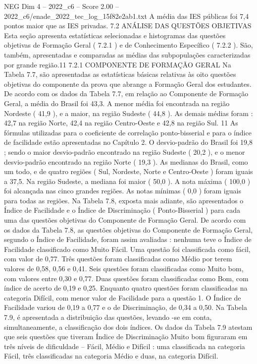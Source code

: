\begin{textsample}{NEG Dim 4 – 2022\_c6 – Score 2.00 – 2022\_c6/enade\_2022\_tec\_log\_15f82e2ab1.txt}
A média das IES públicas foi 7,4 pontos maior que as IES privadas. 7.2 ANÁLISE DAS QUESTÕES OBJETIVAS Esta seção apresenta estatísticas selecionadas e histogramas das questões objetivas de Formação Geral ( 7.2.1 ) e de Conhecimento Específico ( 7.2.2 ).
São, também, apresentadas e comparadas as médias das subpopulações caracterizadas por grande região.11 7.2.1 COMPONENTE DE FORMAÇÃO GERAL Na Tabela 7.7, são apresentadas as estatísticas básicas relativas às oito questões objetivas do componente da prova que abrange a Formação Geral dos estudantes.
De acordo com os dados da Tabela 7.7, em relação ao Componente de Formação Geral, a média do Brasil foi 43,3.
A menor média foi encontrada na região Nordeste ( 41,9 ), e a maior, na região Sudeste ( 44,8 ).
As demais médias foram : 42,7 na região Norte, 42,4 na região Centro-Oeste e 42,8 na região Sul. 11 As fórmulas utilizadas para o coeficiente de correlação ponto-bisserial e para o índice de facilidade estão apresentadas no Capítulo 2.
O desvio-padrão do Brasil foi 19,8 ; sendo o maior desvio-padrão encontrado na região Sudeste ( 20,2 ), e o menor desvio-padrão encontrado na região Norte ( 19,3 ).
As medianas do Brasil, como um todo, e de quatro regiões ( Sul, Nordeste, Norte e Centro-Oeste ) foram iguais a 37,5.
Na região Sudeste, a mediana foi maior ( 50,0 ).
A nota máxima ( 100,0 ) foi alcançada nas cinco grandes regiões.
As notas mínimas ( 0,0 ) foram iguais para todas as regiões.
Na Tabela 7.8, exposta mais adiante, são apresentados o Índice de Facilidade e o Índice de Discriminação ( Ponto-Bisserial ) para cada uma das questões objetivas do Componente de Formação Geral.
De acordo com os dados da Tabela 7.8, as questões objetivas do Componente de Formação Geral, segundo o Índice de Facilidade, foram assim avaliadas : nenhuma teve o Índice de Facilidade classificado como Muito Fácil.
Uma questão foi classificada como fácil, com valor de 0,77.
Três questões foram classificadas como Médio por terem valores de 0,58, 0,56 e 0,41.
Seis questões foram classificadas como Muito bom, com valores entre 0,30 e 0,77.
Duas questões foram classificadas como Bom, com índice de acerto de 0,19 e 0,25.
Enquanto quatro questões foram classificadas na categoria Difícil, com menor valor de Facilidade para a questão 1.
O Índice de Facilidade variou de 0,19 a 0,77 e o de Discriminação, de 0,34 a 0,50.
Na Tabela 7.9, é apresentada a distribuição das questões, levando -se em conta, simultaneamente, a classificação dos dois índices.
Os dados da Tabela 7.9 atestam que seis questões que tiveram Índice de Discriminação Muito bom figuraram em três níveis de dificuldade – Fácil, Médio e Difícil : uma classificada na categoria Fácil, três classificadas na categoria Médio e duas, na categoria Difícil.

\end{textsample}
